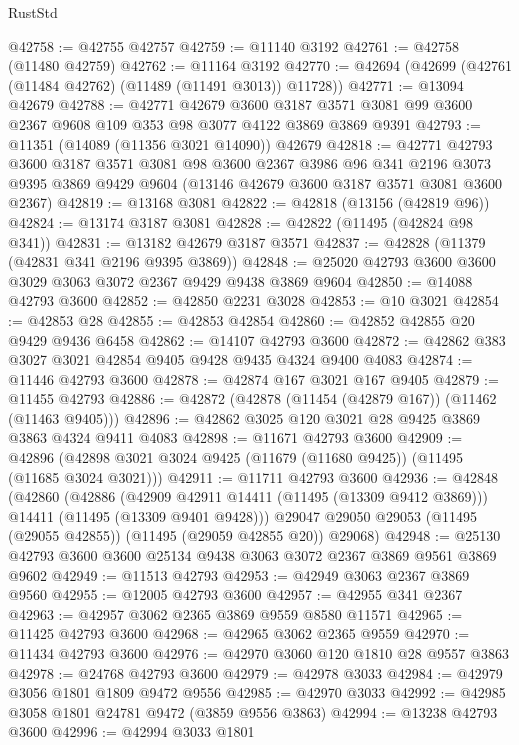 \begin{lexlean}{RustStd}
\begin{coremodule}
@42758 := @42755 @42757
@42759 := @11140 @3192
@42761 := @42758 (@11480 @42759)
@42762 := @11164 @3192
@42770 := @42694 (@42699 (@42761 (@11484 @42762) (@11489 (@11491 @3013)) @11728))
@42771 := @13094 @42679
@42788 := @42771
    @42679
    @3600
    @3187
    @3571
    @3081
    @99
    @3600
    @2367
    @9608
    @109
    @353
    @98
    @3077
    @4122
    @3869
    @3869
    @9391
@42793 := @11351 (@14089 (@11356 @3021 @14090)) @42679
@42818 := @42771
    @42793
    @3600
    @3187
    @3571
    @3081
    @98
    @3600
    @2367
    @3986
    @96
    @341
    @2196
    @3073
    @9395
    @3869
    @9429
    @9604
    (@13146 @42679 @3600 @3187 @3571 @3081 @3600 @2367)
@42819 := @13168 @3081
@42822 := @42818 (@13156 (@42819 @96))
@42824 := @13174 @3187 @3081
@42828 := @42822 (@11495 (@42824 @98 @341))
@42831 := @13182 @42679 @3187 @3571
@42837 := @42828 (@11379 (@42831 @341 @2196 @9395 @3869))
@42848 := @25020 @42793 @3600 @3600 @3029 @3063 @3072 @2367 @9429 @9438 @3869 @9604
@42850 := @14088 @42793 @3600
@42852 := @42850 @2231 @3028
@42853 := @10 @3021
@42854 := @42853 @28
@42855 := @42853 @42854
@42860 := @42852 @42855 @20 @9429 @9436 @6458
@42862 := @14107 @42793 @3600
@42872 := @42862 @383 @3027 @3021 @42854 @9405 @9428 @9435 @4324 @9400 @4083
@42874 := @11446 @42793 @3600
@42878 := @42874 @167 @3021 @167 @9405
@42879 := @11455 @42793
@42886 := @42872 (@42878 (@11454 (@42879 @167)) (@11462 (@11463 @9405)))
@42896 := @42862 @3025 @120 @3021 @28 @9425 @3869 @3863 @4324 @9411 @4083
@42898 := @11671 @42793 @3600
@42909 := @42896 (@42898 @3021 @3024 @9425 (@11679 (@11680 @9425)) (@11495 (@11685 @3024 @3021)))
@42911 := @11711 @42793 @3600
@42936 := @42848
    (@42860
      (@42886
        (@42909 @42911 @14411 (@11495 (@13309 @9412 @3869)))
        @14411
        (@11495 (@13309 @9401 @9428)))
      @29047
      @29050
      @29053
      (@11495 (@29055 @42855))
      (@11495 (@29059 @42855 @20))
      @29068)
@42948 := @25130 @42793 @3600 @3600 @25134 @9438 @3063 @3072 @2367 @3869 @9561 @3869 @9602
@42949 := @11513 @42793
@42953 := @42949 @3063 @2367 @3869 @9560
@42955 := @12005 @42793 @3600
@42957 := @42955 @341 @2367
@42963 := @42957 @3062 @2365 @3869 @9559 @8580 @11571
@42965 := @11425 @42793 @3600
@42968 := @42965 @3062 @2365 @9559
@42970 := @11434 @42793 @3600
@42976 := @42970 @3060 @120 @1810 @28 @9557 @3863
@42978 := @24768 @42793 @3600
@42979 := @42978 @3033
@42984 := @42979 @3056 @1801 @1809 @9472 @9556
@42985 := @42970 @3033
@42992 := @42985 @3058 @1801 @24781 @9472 (@3859 @9556 @3863)
@42994 := @13238 @42793 @3600
@42996 := @42994 @3033 @1801

\end{coremodule}
\end{lexlean}
